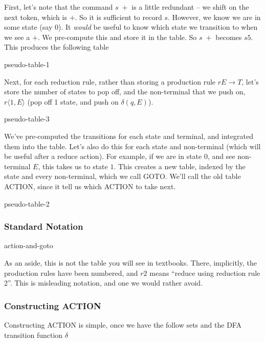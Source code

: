 First, let's note that the command $s \; +$ is a little redundant -- we shift on the next token, which is $+$. So it is sufficient to record $s$. However, we know we are in some state (say $0$). It \textit{would} be useful to know which state we transition to when we see a $+$. We pre-compute this and store it in the table. So $s \; +$ becomes $s5$. This produces the following table

\begin{center}
    {pseudo-table-1}
\end{center}

Next, for each reduction rule, rather than storing a production rule $r E \to T$, let's store the number of states to pop off, and the non-terminal that we push on, $r \langle 1, E \rangle$ (pop off 1 state, and push on $\delta(q, E)$). 

\begin{center}
    {pseudo-table-3}
\end{center}

We've pre-computed the transitions for each state and terminal, and integrated them into the table. Let's also do this for each state and non-terminal (which will be useful after a reduce action). For example, if we are in state $0$, and see non-terminal $E$, this takes us to state $1$. This creates a new table, indexed by the state and every non-terminal, which we call GOTO. We'll call the old table ACTION, since it tell us which ACTION to take next.

\begin{center}
    {pseudo-table-2}
\end{center}

\subsubsection{Standard Notation}
\begin{center}
    {action-and-goto}
\end{center}
As an aside, this is not the table you will see in textbooks. There, implicitly, the production rules have been numbered, and $r2$ means ``reduce using reduction rule 2''. This is misleading notation, and one we would rather avoid.

\subsubsection{Constructing ACTION}
Constructing ACTION is simple, once we have the follow sets and the DFA transition function $\delta$


